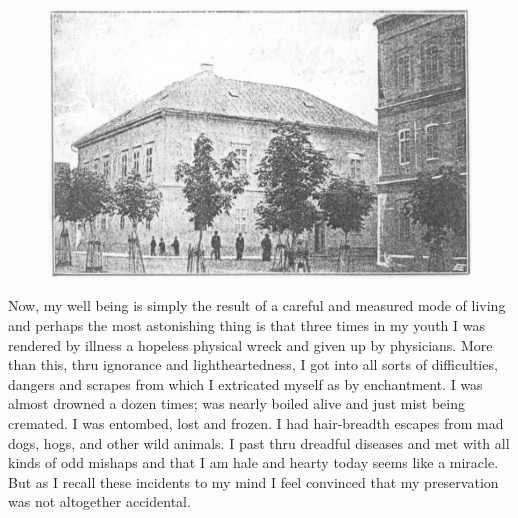 \documentclass[a4paper,12pt,english,twoside,openright]{memoir}
\begin{document}
		\begin{figure}[b]
		\centering
		\includegraphics[width=.75\textwidth]{House.png}
		\end{figure}
	
	Now, my well being is simply the result of a careful and measured mode of living and perhaps the 
	most astonishing thing is that three times in my youth I was rendered by illness a hopeless 
	physical wreck and given up by physicians.  More than this, thru ignorance and lightheartedness, 
	I got into all sorts of difficulties, dangers and scrapes from which I extricated myself as by 
	enchantment.  I was almost drowned a dozen times; was nearly boiled alive and just mist being 
	cremated.  I was entombed, lost and frozen.  I had hair-breadth escapes from mad dogs, hogs, 
	and other wild animals.  I past thru dreadful diseases and met with all kinds of odd mishaps and 
	that I am hale and hearty today seems like a miracle.  But as I recall these incidents to my mind I 
	feel convinced that my preservation was not altogether accidental.  
	
\end{document}
